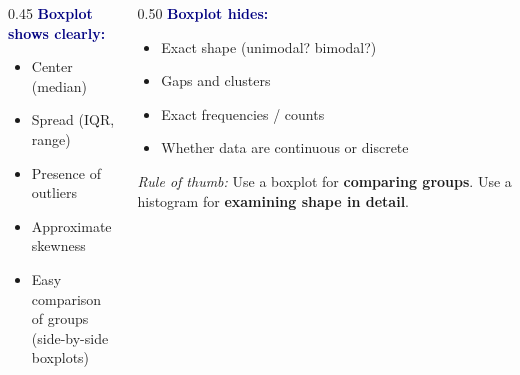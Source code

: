 \documentclass[aspectratio=169, 11pt]{beamer}
\begin{document}
{
\begin{frame}[t, plain]
  \vspace{0.8em}%
  \hspace{0.55cm}%
  \begin{minipage}{0.9\textwidth}
    \small
    \begin{columns}[T]
    \begin{column}{0.45\textwidth}
      \textbf{\textcolor{navy}{Boxplot shows clearly:}}
      \begin{itemize}\setlength{\itemsep}{0.4em}
        \item Center (median)
        \item Spread (IQR, range)
        \item Presence of outliers
        \item Approximate skewness
        \item Easy comparison of groups\\
              (side-by-side boxplots)
      \end{itemize}
    \end{column}
    \begin{column}{0.50\textwidth}
      \textbf{\textcolor{navy}{Boxplot hides:}}
      \begin{itemize}\setlength{\itemsep}{0.4em}
        \item Exact shape (unimodal? bimodal?)
        \item Gaps and clusters
        \item Exact frequencies / counts
        \item Whether data are continuous or discrete
      \end{itemize}

      \vspace{0.4em}
      {\color{navy}\textit{Rule of thumb:}
      Use a boxplot for \textbf{comparing groups}.
      Use a histogram for \textbf{examining shape in detail}.}
    \end{column}
    \end{columns}
  \end{minipage}
\end{frame}
}
\end{document}
